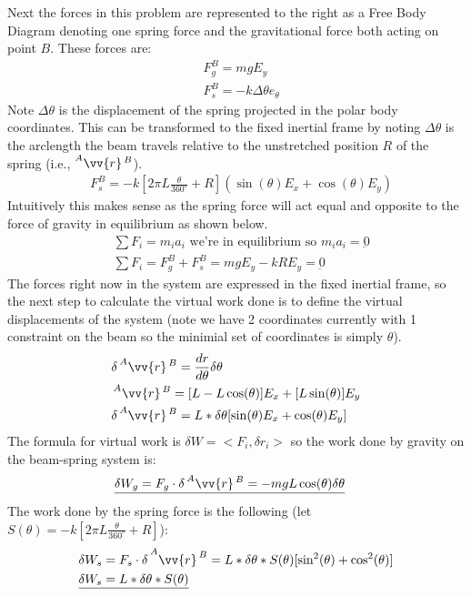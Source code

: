 \documentclass{article}
\begin{document}
Next the forces in this problem are represented to the right as a Free Body Diagram denoting one spring force and the gravitational force both acting on point $B$. These forces are:
\begin{align*}
    & F_g^B = m g E_y \\
    & F_s^B = -k \Delta \theta e_{\theta}
\end{align*}
Note $\Delta \theta$ is the displacement of the spring projected in the polar body coordinates. This can be transformed to the fixed inertial frame by noting $\Delta \theta$ is the arclength the beam travels relative to the unstretched position $R$ of the spring (i.e., $\prescript{A}{}{\vv{r}}^{\, B}$).
\begin{align*}
    & F_s^B = -k [2 \pi L \frac{\theta}{360^{\circ}} + R](\sin(\theta) E_x + \cos(\theta) E_y)
\end{align*}
Intuitively this makes sense as the spring force will act equal and opposite to the force of gravity in equilibrium as shown below.
\begin{align*}
    & \sum F_i = m_i a_i \text{ we're in equilibrium so } m_i a_i = \underbar{0} \\
    & \sum F_i = F_g^B + F_s^B = mg E_y - k R E_y = \underbar{0}
\end{align*}
The forces right now in the system are expressed in the fixed inertial frame, so the next step to calculate the virtual work done is to define the virtual displacements of the system (note we have 2 coordinates currently with 1 constraint on the beam so the minimial set of coordinates is simply $\theta$).
\begin{align*}
    & \delta \prescript{A}{}{\vv{r}}^{\, B} = \frac{d r}{d \theta} \delta \theta \\
    & \prescript{A}{}{\vv{r}}^{\, B} = [L - L \cos(\theta)] E_x + [L \sin(\theta)] E_y \\
    & \delta \prescript{A}{}{\vv{r}}^{\, B} = L * \delta \theta [\sin (\theta) E_x + \cos(\theta) E_y]
\end{align*}
The formula for virtual work is $\delta W = <F_i, \delta r_i>$ so the work done by gravity on the beam-spring system is:
\begin{align*}
    & \underline{\delta W_g = F_g \cdot \delta \prescript{A}{}{\vv{r}}^{\, B} = -m g L \cos(\theta) \delta \theta}
\end{align*}
The work done by the spring force is the following (let $S(\theta) = -k [2 \pi L \frac{\theta}{360^{\circ}} + R]$):
\begin{align*}
    & \delta W_s = F_s \cdot \delta \prescript{A}{}{\vv{r}^{\, B}} = L * \delta \theta * S(\theta) [\sin^2(\theta) + \cos^2(\theta)] \\
    & \underline{\delta W_s = L * \delta \theta * S(\theta)}
\end{align*}
\end{document}
